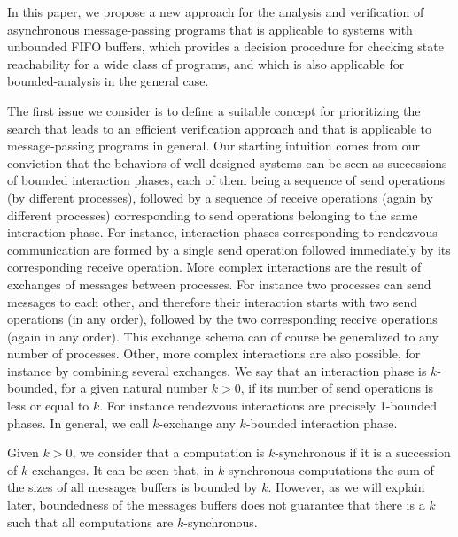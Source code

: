 In this paper, we propose a new approach for the analysis and verification of asynchronous message-passing programs that is applicable to systems with unbounded FIFO buffers, which provides a decision procedure for checking state reachability for a wide class of programs, and which is also applicable for bounded-analysis in the general case. 

The first issue we consider is to define a suitable concept for prioritizing the search that leads to an efficient verification approach and that is applicable to message-passing programs in general. Our starting intuition comes from our conviction that the behaviors of well designed systems can be seen as successions of bounded interaction phases, each of them being a sequence of send operations (by different processes), followed by a sequence of receive operations (again by different processes) corresponding to send operations belonging to the same interaction phase. For instance, interaction phases corresponding to rendezvous communication are formed by a single send operation followed immediately by its corresponding receive operation. More complex interactions are the result of exchanges of messages between processes. For instance two processes can send messages to each other, and therefore their interaction starts with two send operations (in any order), followed by the two corresponding receive operations (again in any order). This exchange schema can of course be generalized to any number of processes. Other, more complex interactions are also possible, for instance by combining several exchanges. We say that an interaction phase is $k$-bounded, for a given natural number $k > 0$, if its number of send operations is less or equal to $k$. For instance rendezvous interactions are precisely 1-bounded phases.  In general, we call $k$-exchange any $k$-bounded interaction phase. 

Given $k > 0$, we consider that a computation is $k$-synchronous if it is a succession of $k$-exchanges.
It can be seen that, in $k$-synchronous computations the sum of the sizes of all messages buffers is bounded by $k$. However, as we will explain later, boundedness of the messages buffers does not guarantee that there is a $k$ such that all computations are $k$-synchronous.


